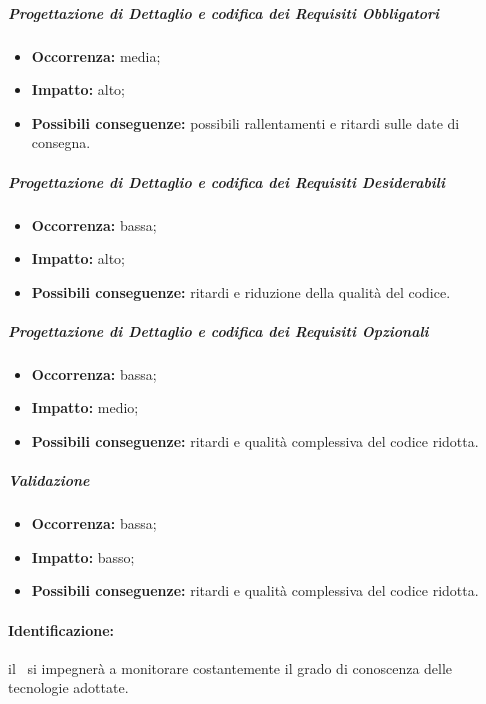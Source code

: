 \documentclass[../PianoProgetto.tex]{subfiles}
\begin{document}
		\subparagraph*{Progettazione di Dettaglio e codifica dei Requisiti Obbligatori}
			\begin{itemize}[label={-}]
				\item \textbf{Occorrenza:} media;
				\item \textbf{Impatto:} alto;
				\item \textbf{Possibili conseguenze:} possibili rallentamenti e ritardi sulle date di consegna.
			\end{itemize}
			
		\subparagraph*{Progettazione di Dettaglio e codifica dei Requisiti Desiderabili}
			\begin{itemize}[label={-}]
				\item \textbf{Occorrenza:} bassa;
				\item \textbf{Impatto:} alto;
				\item \textbf{Possibili conseguenze:} ritardi e riduzione della qualità del codice.
			\end{itemize}
			
		\subparagraph*{Progettazione di Dettaglio e codifica dei Requisiti Opzionali}
			\begin{itemize}[label={-}]
				\item \textbf{Occorrenza:} bassa;
				\item \textbf{Impatto:} medio;
				\item \textbf{Possibili conseguenze:} ritardi e qualità complessiva del codice ridotta.
			\end{itemize}	
			
		\subparagraph*{Validazione}
			\begin{itemize}[label={-}]
				\item \textbf{Occorrenza:} bassa;
				\item \textbf{Impatto:} basso;
				\item \textbf{Possibili conseguenze:} ritardi e qualità complessiva del codice ridotta.
			\end{itemize}		
	
	\paragraph*{Identificazione:} il \responsabilediprogetto\ si impegnerà a monitorare costantemente il grado di conoscenza delle tecnologie adottate.	
	
\end{document}
